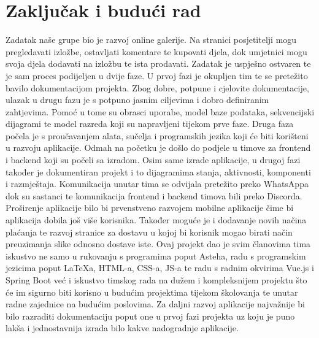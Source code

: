 \chapter{Zaključak i budući rad}
		

		{Zadatak naše grupe bio je razvoj online galerije. Na stranici posjetitelji mogu pregledavati izložbe, ostavljati komentare te kupovati djela, dok umjetnici mogu svoja djela dodavati na izložbu te ista prodavati. Zadatak je uspješno ostvaren te je sam proces podijeljen u dvije faze. 
		U prvoj fazi je okupljen tim te se pretežito bavilo dokumentacijom projekta. Zbog dobre, potpune i cjelovite dokumentacije, ulazak u drugu fazu je s potpuno jasnim ciljevima i dobro definiranim zahtjevima. Pomoć u tome su  obrasci uporabe, model baze podataka, sekvencijski dijagrami te
		model razreda koji su napravljeni tijekom prve faze. Druga faza počela je s proučavanjem alata, sučelja i programskih jezika koji će biti korišteni u razvoju aplikacije. Odmah na početku je došlo do podjele u timove za frontend i backend  koji su počeli sa izradom. Osim same izrade aplikacije, u drugoj fazi također je  dokumentiran projekt i to dijagramima stanja, aktivnosti, komponenti i razmještaja. Komunikacija unutar tima se odvijala pretežito preko WhatsAppa dok su sastanci te komunikacija frontend i backend timova bili preko Discorda. 
		Proširenje aplikacije bilo bi prvenstveno razvojem mobilne aplikacije čime bi aplikacija dobila još više korisnika. Također moguće je i dodavanje novih načina plaćanja te razvoj stranice za dostavu u kojoj bi korisnik mogao birati način preuzimanja slike odnosno dostave iste.
		 Ovaj projekt dao je svim članovima tima iskustvo ne samo u rukovanju s programima poput Asteha, radu s programskim jezicima poput LaTeXa, HTML-a, CSS-a, JS-a te radu s radnim okvirima Vue.js i Spring Boot
		već i iskustvo timskog rada na dužem i kompleksnijem projektu što će im sigurno biti korisno u budućim projektima tijekom školovanja te unutar radne zajednice na budućim poslovima.
		Za daljni razvoj aplikacije najvažnije bi bilo razraditi dokumentaciju poput one u prvoj fazi projekta uz koju je puno lakša i jednostavnija izrada bilo kakve nadogradnje aplikacije.
		 }
		
		\eject 